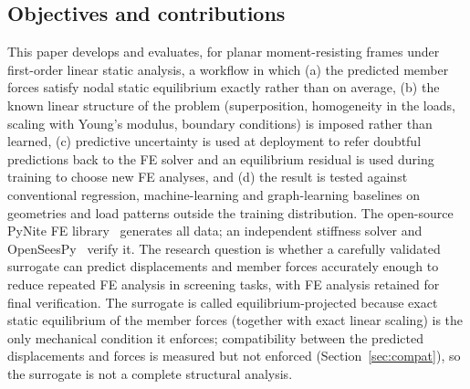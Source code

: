 \subsection{Objectives and contributions}

This paper develops and evaluates, for planar moment-resisting frames under first-order linear static analysis, a workflow in which (a) the predicted member forces satisfy nodal static equilibrium exactly rather than on average, (b) the known linear structure of the problem (superposition, homogeneity in the loads, scaling with Young's modulus, boundary conditions) is imposed rather than learned, (c) predictive uncertainty is used at deployment to refer doubtful predictions back to the FE solver and an equilibrium residual is used during training to choose new FE analyses, and (d) the result is tested against conventional regression, machine-learning and graph-learning baselines on geometries and load patterns outside the training distribution. The open-source PyNite FE library~\cite{pynite} generates all data; an independent stiffness solver and OpenSeesPy~\cite{zhu2018openseespy} verify it. The research question is whether a carefully validated surrogate can predict displacements and member forces accurately enough to reduce repeated FE analysis in screening tasks, with FE analysis retained for final verification. The surrogate is called equilibrium-projected because exact static equilibrium of the member forces (together with exact linear scaling) is the only mechanical condition it enforces; compatibility between the predicted displacements and forces is measured but not enforced (Section~\ref{sec:compat}), so the surrogate is not a complete structural analysis.

